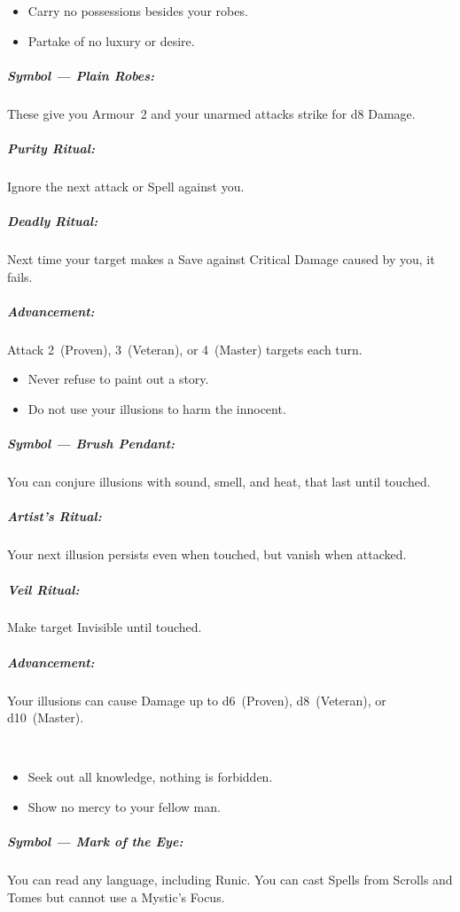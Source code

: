 \documentclass[itdr]{subfiles}
\begin{document}
\vfill

{\em\begin{itemize}
		\item Carry no possessions besides your robes.
		\item Partake of no luxury or desire.
\end{itemize}}

\subparagraph{Symbol --- Plain Robes:} These give you Armour~2 and your unarmed attacks strike for d8 Damage.

\subparagraph{Purity Ritual:} Ignore the next attack or Spell against you.

\subparagraph{Deadly Ritual:} Next time your target makes a Save against Critical Damage caused by you, it fails.

\subparagraph{Advancement:} Attack 2~(Proven), 3~(Veteran), or 4~(Master) targets each turn.

\vfill

{\em\begin{itemize}
		\item Never refuse to paint out a story.
		\item Do not use your illusions to harm the innocent.
\end{itemize}}

\subparagraph{Symbol --- Brush Pendant:} You can conjure illusions with sound, smell, and heat, that last until touched.

\subparagraph{Artist's Ritual:} Your next illusion persists even when touched, but vanish when attacked.

\subparagraph{Veil Ritual:} Make target Invisible until touched.

\subparagraph{Advancement:} Your illusions can cause Damage up to d6~(Proven), d8~(Veteran), or d10~(Master).

\vfill
\break

~\vspace{1.5ex}

{\em\begin{itemize}
		\item Seek out all knowledge, nothing is forbidden.
		\item Show no mercy to your fellow man.
\end{itemize}}

\subparagraph{Symbol --- Mark of the Eye:} You can read any language, including Runic. You can cast Spells from Scrolls and Tomes but cannot use a Mystic's Focus.
\end{document}
